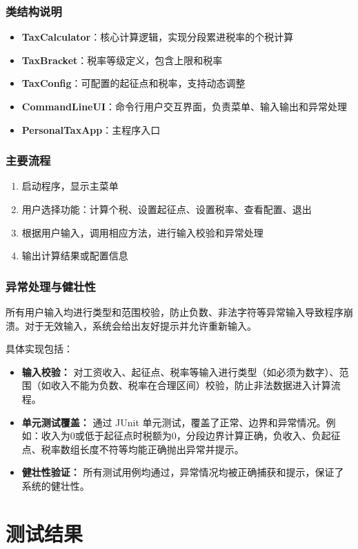 \subsection{类结构说明}
\begin{itemize}
	\item \textbf{TaxCalculator}：核心计算逻辑，实现分段累进税率的个税计算
	\item \textbf{TaxBracket}：税率等级定义，包含上限和税率
	\item \textbf{TaxConfig}：可配置的起征点和税率，支持动态调整
	\item \textbf{CommandLineUI}：命令行用户交互界面，负责菜单、输入输出和异常处理
	\item \textbf{PersonalTaxApp}：主程序入口
\end{itemize}
\subsection{主要流程}
\begin{enumerate}
	\item 启动程序，显示主菜单
	\item 用户选择功能：计算个税、设置起征点、设置税率、查看配置、退出
	\item 根据用户输入，调用相应方法，进行输入校验和异常处理
	\item 输出计算结果或配置信息
\end{enumerate}
\subsection{异常处理与健壮性}
所有用户输入均进行类型和范围校验，防止负数、非法字符等异常输入导致程序崩溃。对于无效输入，系统会给出友好提示并允许重新输入。

具体实现包括：
\begin{itemize}
	\item \textbf{输入校验：} 对工资收入、起征点、税率等输入进行类型（如必须为数字）、范围（如收入不能为负数、税率在合理区间）校验，防止非法数据进入计算流程。
	\item \textbf{单元测试覆盖：} 通过 JUnit 单元测试，覆盖了正常、边界和异常情况。例如：收入为0或低于起征点时税额为0，分段边界计算正确，负收入、负起征点、税率数组长度不符等均能正确抛出异常并提示。
	\item \textbf{健壮性验证：} 所有测试用例均通过，异常情况均被正确捕获和提示，保证了系统的健壮性。
\end{itemize}

\chapter{测试结果}

